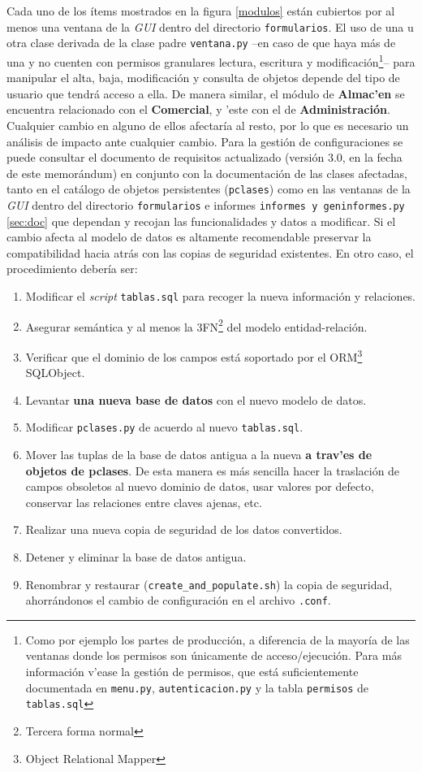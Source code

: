 \documentclass[a4paper]{article}
\begin{document}
        Cada uno de los ítems mostrados en la figura \ref{modulos} están cubiertos por al menos una ventana de la \emph{GUI} dentro del directorio \texttt{formularios}. El uso de una u otra clase derivada de la clase padre \texttt{ventana.py} --en caso de que haya más de una y no cuenten con permisos granulares lectura, escritura y modificación\footnote{Como por ejemplo los partes de producción, a diferencia de la mayoría de las ventanas donde los permisos son únicamente de acceso/ejecución. Para más información v'ease la gestión de permisos, que está suficientemente documentada en \texttt{menu.py}, \texttt{autenticacion.py} y la tabla \texttt{permisos} de \texttt{tablas.sql}}-- para manipular el alta, baja, modificación y consulta de objetos depende del tipo de usuario que tendrá acceso a ella.
        De manera similar, el módulo de \textbf{Almac'en} se encuentra relacionado con el \textbf{Comercial}, y 'este con el de \textbf{Administración}. Cualquier cambio en alguno de ellos afectaría al resto, por lo que es necesario un análisis de impacto ante cualquier cambio. Para la gestión de configuraciones se puede consultar el documento de requisitos actualizado (versión 3.0, en la fecha de este memorándum) en conjunto con la documentación de las clases afectadas, tanto en el catálogo de objetos persistentes (\texttt{pclases}) como en las ventanas de la \emph{GUI} dentro del directorio \texttt{formularios} e informes \texttt{informes y geninformes.py} \ref{sec:doc} que dependan y recojan las funcionalidades y datos a modificar. Si el cambio afecta al modelo de datos es altamente recomendable preservar la compatibilidad hacia atrás con las copias de seguridad existentes. En otro caso, el procedimiento debería ser:
        \begin{enumerate}
        \item Modificar el \emph{script} \texttt{tablas.sql} para recoger la nueva información y relaciones.
        \item Asegurar semántica y al menos la 3FN\footnote{Tercera forma normal} del modelo entidad-relación.
        \item Verificar que el dominio de los campos está soportado por el ORM\footnote{Object Relational Mapper} SQLObject.
        \item Levantar \textbf{una nueva base de datos} con el nuevo modelo de datos.
        \item Modificar \texttt{pclases.py} de acuerdo al nuevo \texttt{tablas.sql}.
        \item Mover las tuplas de la base de datos antigua a la nueva \textbf{a trav'es de objetos de pclases}. De esta manera es más sencilla hacer la traslación de campos obsoletos al nuevo dominio de datos, usar valores por defecto, conservar las relaciones entre claves ajenas, etc.
        \item Realizar una nueva copia de seguridad de los datos convertidos.
        \item Detener y eliminar la base de datos antigua.
        \item Renombrar y restaurar (\texttt{create\_and\_populate.sh}) la copia de seguridad, ahorrándonos el cambio de configuración en el archivo \texttt{.conf}.
        \end{enumerate}
\end{document}

